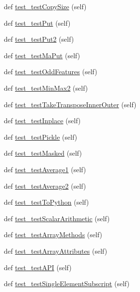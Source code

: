 \begin{DoxyCompactItemize}
def \hyperlink{classnumpy_1_1ma_1_1tests_1_1test__old__ma_1_1TestMa_a1e60b8355366315e3ed0c6a3e4383178}{test\+\_\+test\+Copy\+Size} (self)
\item 
def \hyperlink{classnumpy_1_1ma_1_1tests_1_1test__old__ma_1_1TestMa_aea8d8fbeae926147f13c81a172c7f4b6}{test\+\_\+test\+Put} (self)
\item 
def \hyperlink{classnumpy_1_1ma_1_1tests_1_1test__old__ma_1_1TestMa_a62abd79701a9950437e897a1ca9acfa4}{test\+\_\+test\+Put2} (self)
\item 
def \hyperlink{classnumpy_1_1ma_1_1tests_1_1test__old__ma_1_1TestMa_a4f2c47facc3ff916f9f3b670e52fd016}{test\+\_\+test\+Ma\+Put} (self)
\item 
def \hyperlink{classnumpy_1_1ma_1_1tests_1_1test__old__ma_1_1TestMa_a7ba3a244d4e98794e0a9d2c9b741edcf}{test\+\_\+test\+Odd\+Features} (self)
\item 
def \hyperlink{classnumpy_1_1ma_1_1tests_1_1test__old__ma_1_1TestMa_aa20b8acd2ed957320cd8df113bce8982}{test\+\_\+test\+Min\+Max2} (self)
\item 
def \hyperlink{classnumpy_1_1ma_1_1tests_1_1test__old__ma_1_1TestMa_a43519607c71e0b8a555855e50571550a}{test\+\_\+test\+Take\+Transpose\+Inner\+Outer} (self)
\item 
def \hyperlink{classnumpy_1_1ma_1_1tests_1_1test__old__ma_1_1TestMa_abd06face4bf6e979751b15f0d020dfac}{test\+\_\+test\+Inplace} (self)
\item 
def \hyperlink{classnumpy_1_1ma_1_1tests_1_1test__old__ma_1_1TestMa_a5f4062a82371db02ce2f2102dbd737c4}{test\+\_\+test\+Pickle} (self)
\item 
def \hyperlink{classnumpy_1_1ma_1_1tests_1_1test__old__ma_1_1TestMa_ae5d6f03f68981a5d18b18c6afcd1188a}{test\+\_\+test\+Masked} (self)
\item 
def \hyperlink{classnumpy_1_1ma_1_1tests_1_1test__old__ma_1_1TestMa_af0faf0003af29f0b91c8ce39a4ea31ec}{test\+\_\+test\+Average1} (self)
\item 
def \hyperlink{classnumpy_1_1ma_1_1tests_1_1test__old__ma_1_1TestMa_a1e395080883e6532ef2cdb6c676be6e3}{test\+\_\+test\+Average2} (self)
\item 
def \hyperlink{classnumpy_1_1ma_1_1tests_1_1test__old__ma_1_1TestMa_aaf5eff5940839a63ad0d37fc9a023953}{test\+\_\+test\+To\+Python} (self)
\item 
def \hyperlink{classnumpy_1_1ma_1_1tests_1_1test__old__ma_1_1TestMa_a78821c78869234d36a3bb9ebd4037d5f}{test\+\_\+test\+Scalar\+Arithmetic} (self)
\item 
def \hyperlink{classnumpy_1_1ma_1_1tests_1_1test__old__ma_1_1TestMa_af1cb6b0cdf1c316a73d095806041d0f4}{test\+\_\+test\+Array\+Methods} (self)
\item 
def \hyperlink{classnumpy_1_1ma_1_1tests_1_1test__old__ma_1_1TestMa_a07ade1ead09c4f116b601f31147df647}{test\+\_\+test\+Array\+Attributes} (self)
\item 
def \hyperlink{classnumpy_1_1ma_1_1tests_1_1test__old__ma_1_1TestMa_a6608e419ed85f602f29331a507e8c2dd}{test\+\_\+test\+A\+PI} (self)
\item 
def \hyperlink{classnumpy_1_1ma_1_1tests_1_1test__old__ma_1_1TestMa_a46a8b11ff037ed76d2e7881cc4e6dcaa}{test\+\_\+test\+Single\+Element\+Subscript} (self)
\end{DoxyCompactItemize}
